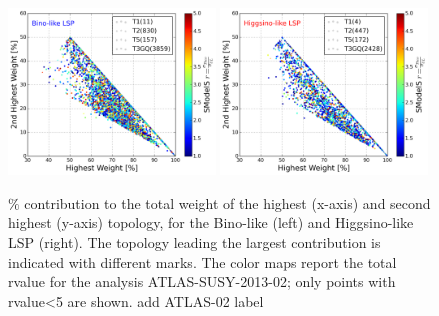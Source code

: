 \documentclass[a4paper,11pt]{article}
\begin{document}
%
\begin{figure}[!]
\begin{center}
\subfigure
\includegraphics[width=0.49\textwidth]{PLOTS/Weights/Weight_Fraction_r5BINO.png}
\subfigure
{\includegraphics[width=0.49\textwidth]{PLOTS/Weights/Weight_Fraction_r5HIGGSINO.png}}
\end{center}
\caption{$\%$ contribution to the total weight of the highest (x-axis) and second highest (y-axis) topology, for the Bino-like (left) and Higgsino-like LSP (right). The topology leading the largest contribution is indicated with different marks. The color maps report the total rvalue for the analysis ATLAS-SUSY-2013-02; only points with rvalue<5 are shown. 
 {\color{blue} add ATLAS-02 label} }
\label{rValues}
\end{figure}
%
\end{document}
